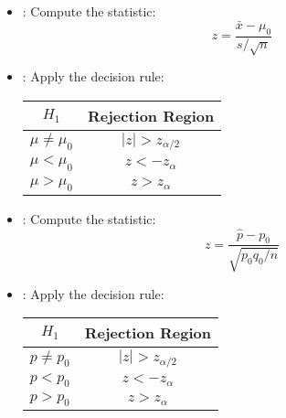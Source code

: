 \begin{multicols*}{3}
\begin{itemize}
  \item {}: Compute the statistic:
    \[
      z = \frac{\bar{x} - \mu_0}{s / \sqrt{n}}
    \]
  \item {}: Apply the decision rule:
      \begin{center}
        \begin{tabular}{|c|c|}
          \hline
          \textbf{$H_1$}   & \textbf{Rejection Region} \\ \hline
          $\mu \neq \mu_0$ & $|z| > z_{\alpha/2}$      \\ \hline
          $\mu < \mu_0$    & $z < -z_{\alpha}$         \\ \hline
          $\mu > \mu_0$    & $z > z_{\alpha}$          \\ \hline
        \end{tabular}
      \end{center}
\end{itemize}

\par {}

\begin{itemize}
  \item {}: Compute the statistic:
    \[
      z = \frac{\hat{p} - p_0}{\sqrt{p_0 q_0 / n}}
    \]
  \item {}: Apply the decision rule:
      \begin{center}
        \begin{tabular}{|c|c|}
          \hline
          \textbf{$H_1$}   & \textbf{Rejection Region} \\ \hline
          $p \neq p_0$ & $|z| > z_{\alpha/2}$      \\ \hline
          $p < p_0$    & $z < -z_{\alpha}$         \\ \hline
          $p > p_0$    & $z > z_{\alpha}$          \\ \hline
        \end{tabular}
      \end{center}
\end{itemize}


\end{multicols*}
